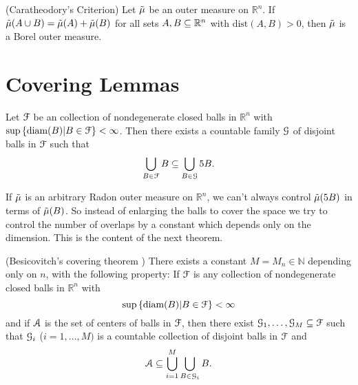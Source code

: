 \begin{thm}\cite[sec 1.1]{evans1991measure}(Caratheodory's Criterion)
  Let $\tilde{\mu}$ be an outer measure on $ \mathbb{R}^n$. If $\tilde{\mu}(A\cup B) =
  \tilde{\mu}(A)+\tilde{\mu}(B)$ for all sets $A,B\subseteq \mathbb{R}^n$ with
  $\text{dist}(A,B)>0$, then $\tilde{\mu}$ is a Borel outer measure.
\end{thm}


\section{Covering Lemmas}
\label{sec:covering_lemmas}

\begin{thm}\cite[sec 1.5.1]{evans1991measure}
Let $\mathcal{F}$ be an collection of nondegenerate closed balls in
$\mathbb{R}^n$ with $\sup\left\{ \text{diam}(B) | B\in \mathcal{F} \right\}
< \infty$.
  Then there exists a countable family $\mathcal{G}$ of disjoint balls
  in $\mathcal{F}$ such that
  \begin{equation*}
    \bigcup_{B\in \mathcal{F}}B \subseteq \bigcup_{B\in
      \mathcal{G}}5B.
  \end{equation*}
\end{thm}

If $\tilde{\mu}$ is an arbitrary Radon outer measure on
$\mathbb{R}^n$, we can't always control $\tilde{\mu}(5B)$ in terms of
$\tilde{\mu}(B)$. So instead of enlarging the balls to cover the space we
try to control the number of overlaps by a constant which depends
only on the dimension. This is the content of the next theorem.

\begin{thm}(Besicovitch's covering theorem
    )\cite[sec 1.5.2]{evans1991measure}
  There exists a constant $M=M_n\in \mathbb{N}$ depending only on $n$, with the
  following property: If $\mathcal{F}$ is any collection of
  nondegenerate closed balls in $\mathbb{R}^n$ with
  \begin{equation*}
    \sup\left\{ \text{diam}(B) | B\in \mathcal{F} \right\}
< \infty
  \end{equation*}
  and if $\mathcal{A}$ is the set of centers of balls in $\mathcal{F}$,
  then there exist $\mathcal{G}_1,\ldots,\mathcal{G}_{M} \subseteq \mathcal{F}$
  such that $\mathcal{G}_i$ ($i=1,\ldots,M)$ is a countable collection
  of disjoint balls in $\mathcal{F}$ and
  \begin{equation*}
    \mathcal{A} \subseteq \bigcup_{i=1}^M\bigcup_{B\in \mathcal{G}_i}B.
  \end{equation*}
\end{thm}

